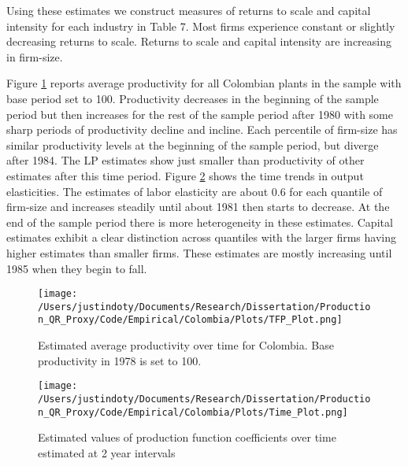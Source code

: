 \documentclass[11pt]{article}
\begin{document}
Using these estimates we construct measures of returns to scale and capital intensity for each industry in Table 7. Most firms experience constant or slightly decreasing returns to scale. Returns to scale and capital intensity are increasing in firm-size.


Figure \ref{fig:COLpgrowth} reports average productivity for all Colombian plants in the sample with base period set to 100. Productivity decreases in the beginning of the sample period but then increases for the rest of the sample period after 1980 with some sharp periods of productivity decline and incline. Each percentile of firm-size has similar productivity levels at the beginning of the sample period, but diverge after 1984. The LP estimates show just smaller than productivity of other estimates after this time period. Figure \ref{fig:COLtimecoef} shows the time trends in output elasticities. The estimates of labor elasticity are about 0.6 for each quantile of firm-size and increases steadily until about 1981 then starts to decrease. At the end of the sample period there is more heterogeneity in these estimates. Capital estimates exhibit a clear distinction across quantiles with the larger firms having higher estimates than smaller firms. These estimates are mostly increasing until 1985 when they begin to fall.

\begin{figure}[H]
\centering
\texttt{[image: /Users/justindoty/Documents/Research/Dissertation/Production\_QR\_Proxy/Code/Empirical/Colombia/Plots/TFP\_Plot.png]}
\caption{Estimated average productivity over time for Colombia. Base productivity in 1978 is set to 100.}
\label{fig:COLpgrowth}
\end{figure}



\begin{figure}[H]
\centering
\texttt{[image: /Users/justindoty/Documents/Research/Dissertation/Production\_QR\_Proxy/Code/Empirical/Colombia/Plots/Time\_Plot.png]}
\caption{Estimated values of production function coefficients over time estimated at 2 year intervals}
\label{fig:COLtimecoef}
\end{figure}
\end{document}
